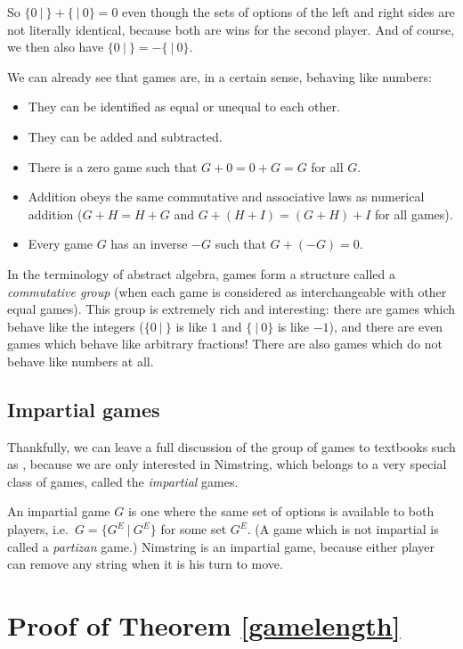 \documentclass[a4paper,twocolumn]{article}
\begin{document}
So $\{0 \:|\:\} + \{\:|\: 0\} = 0$ even though the sets of options of
the left and right sides are not literally identical, because both are
wins for the second player. And of course, we then also have $\{0
\:|\:\} = -\{\:|\: 0\}$.

We can already see that games are, in a certain sense, behaving like
numbers:

\begin{itemize}
  \item They can be identified as equal or unequal to each other.
  \item They can be added and subtracted.
  \item There is a zero game such that $G + 0 = 0 + G = G$ for all $G$.
  \item Addition obeys the same commutative and associative laws as
    numerical addition ($G+H = H+G$ and $G+(H+I)=(G+H)+I$ for all
    games).
  \item Every game $G$ has an inverse $-G$ such that $G + (-G) = 0$.
\end{itemize}

In the terminology of abstract algebra, games form a structure called
a \emph{commutative group} (when each game is considered as
interchangeable with other equal games). This group is extremely rich
and interesting: there are games which behave like the integers ($\{0
\:|\:\}$ is like $1$ and $\{\:|\:0\}$ is like $-1$), and there are
even games which behave like arbitrary fractions! There are also games
which do not behave like numbers at all.

\subsection{Impartial games}

Thankfully, we can leave a full discussion of the group of games to
textbooks such as \cite{lip}, because we are only interested in
Nimstring, which belongs to a very special class of games, called the
\emph{impartial} games.

An impartial game $G$ is one where the same set of options is
available to both players, i.e.\ $G = \{G^E \:|\: G^E\}$ for some set
$G^E$. (A game which is not impartial is called a \emph{partizan}
game.) Nimstring is an impartial game, because either player can
remove any string when it is his turn to move.

\appendix

\section{Proof of Theorem \ref{gamelength}}\label{gamelengthproof}
\end{document}
